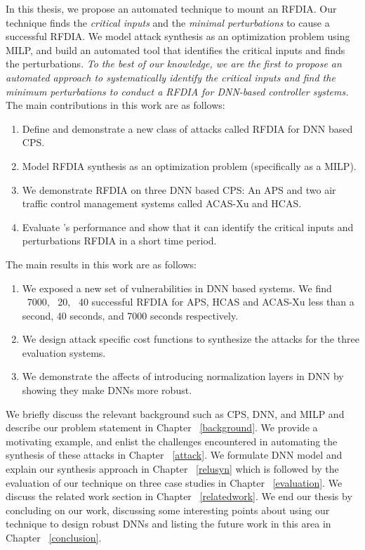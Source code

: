 In this thesis, we propose an automated technique to mount an  \ac{RFDIA}.
Our technique finds the \textit{critical inputs} and the \textit{minimal perturbations} to cause a successful \ac{RFDIA}. 
We model attack synthesis as an optimization problem using \ac{MILP}, and build an automated tool \tool that identifies the critical inputs and finds the perturbations.
{\em To the best of our knowledge, we are the first to  propose an automated approach to systematically identify the critical inputs and find the minimum perturbations to conduct a \ac{RFDIA} for DNN-based controller systems.
}
The main contributions in this work are as follows:

\begin{enumerate}
	\item Define and demonstrate a new class of attacks called \ac{RFDIA} for \ac{DNN} based \ac{CPS}. 
	\item Model \ac{RFDIA} synthesis as an optimization problem (specifically as a \ac{MILP}). 
	\item We demonstrate \ac{RFDIA} on three \ac{DNN} based \ac{CPS}:  An \ac{APS} and two air traffic control management systems called \ac{ACAS-Xu} and \ac{HCAS}.
	\item Evaluate \tool's performance and show that it can identify the critical inputs and perturbations \ac{RFDIA} in a short time period.  
\end{enumerate}

The main results in this work are as follows:

\begin{enumerate}
	\item We exposed a new set of vulnerabilities in \ac{DNN} based systems. 
	 We find ~7000, ~20, ~40 successful \ac{RFDIA} for \ac{APS}, \ac{HCAS} and \ac{ACAS-Xu} less than a second, 40 seconds, and 7000 seconds respectively. 
	\item We design attack specific cost functions to synthesize the attacks for the three evaluation systems.
	\item We demonstrate the affects of introducing normalization layers in \ac{DNN} by showing they make \ac{DNN}s more robust. 
\end{enumerate}

	
We briefly discuss the relevant background such as \ac{CPS}, \ac{DNN}, and \ac{MILP} and describe our problem statement in Chapter ~\ref{background}.
We provide a motivating example, and enlist the challenges encountered in automating the synthesis of these attacks in Chapter ~\ref{attack}.
We formulate \ac{DNN} model and explain our synthesis approach in Chapter ~\ref{relusyn} which is followed by the evaluation of our technique on three case studies in Chapter ~\ref{evaluation}.
We discuss the related work section in Chapter ~\ref{relatedwork}.
We end our thesis by concluding on our work, discussing some interesting points about using our technique to design robust \ac{DNN}s and listing the future work in this area in Chapter ~\ref{conclusion}.









